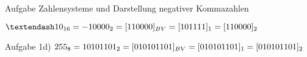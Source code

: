 \begin{frame}[allowframebreaks]{Aufgabe \thesection}{Zahlensysteme und Darstellung negativer Kommazahlen}
\begin{solution}
    $–10_{16} = - 1 0000_2 \newline\newline = [11 0000]_{BV} \newline\newline = [10 1111]_1 \newline\newline = [11 0000]_2$  
  \end{solution}
  \begin{solutionnoinc}
    Aufgabe 1d)\newline\newline
    $255_{8} = 10 101 101_2 \newline\newline = [010 101 101]_{BV} \newline\newline = [010 101 101]_{1} \newline\newline = [010 101 101]_{2}$
  \end{solutionnoinc}
\end{frame}
